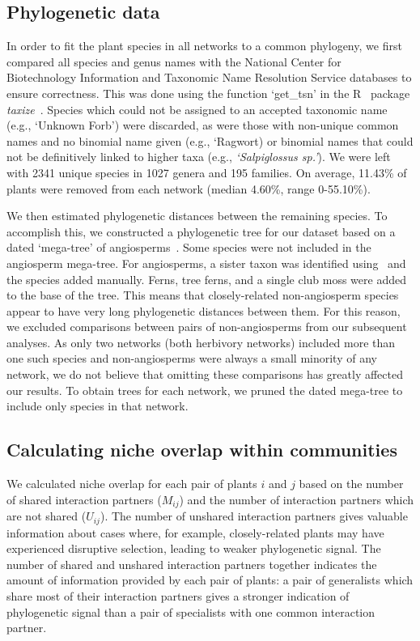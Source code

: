 \documentclass[12pt]{article}
\begin{document}
\begin{spacing}{1.5}
  \subsection*{Phylogenetic data}

    In order to fit the plant species in all networks to a common phylogeny, 
    we first compared all species and genus names with the 
    National Center for Biotechnology Information
    and Taxonomic Name Resolution Service databases to ensure
    correctness. This was done using the function `get\_tsn' in the R~\citep{R}
    package \emph{taxize}~\citep{taxize1,taxize2}. Species which could not 
    be assigned to an accepted taxonomic name (e.g., `Unknown Forb') were 
    discarded, as were those with non-unique common names and no binomial 
    name given (e.g., `Ragwort) or binomial names that could not be definitively 
    linked to  higher taxa (e.g., \emph{`Salpiglossus sp.'}). We were left with 
    2341 unique species in 1027 genera and 195 families. On average, 11.43\% of 
    plants were removed from each network (median 4.60\%, range 0-55.10\%).


    We then estimated phylogenetic distances between the remaining species. To accomplish 
    this, we constructed a phylogenetic tree for our dataset based on a dated
    `mega-tree' of angiosperms~\citep{Zanne2014}. Some species were not included
    in the angiosperm mega-tree. For angiosperms,
    a sister taxon was identified using~\citet{APW} and the species added manually.
    Ferns, tree ferns, and a single club moss were added to the base of the tree.
    This means that closely-related non-angiosperm species appear to have very long 
    phylogenetic distances between them. For this reason, we excluded comparisons 
    between pairs of non-angiosperms from our subsequent analyses. As only two networks (both 
    herbivory networks) included more than one such species and non-angiosperms
    were always a small minority of any network, we do not 
    believe that omitting these comparisons has greatly affected our results.
    To obtain trees for each network, we 
    pruned the dated mega-tree to include only species in that network.


  \subsection*{Calculating niche overlap within communities}

    We calculated niche overlap for each pair of plants $i$ and $j$ based on the number of shared interaction
    partners ($M_{ij}$) and the number of interaction partners which are not
    shared ($U_{ij}$). The number of unshared interaction 
    partners gives valuable information about cases where, for example, 
    closely-related plants may have experienced disruptive selection, leading to weaker phylogenetic signal. The number of shared and unshared interaction partners together indicates the amount of information  provided by each pair of plants: a pair of generalists which share most of their interaction partners gives a stronger indication of phylogenetic signal than a pair of specialists with one common interaction partner.



\end{spacing}
\end{document}

